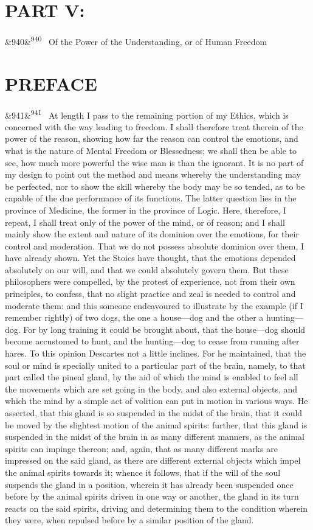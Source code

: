 \documentclass[12pt]{article}
\newcommand{\para}[1][]{\par\noindent\ifx&#1&\else\textsuperscript{\footnotesize #1}~\fi}
\begin{document}
\section*{PART V:}

\para[940] Of the Power of the Understanding, or of Human Freedom

\section*{PREFACE}

\para[941] At length I pass to the remaining portion of my Ethics, which is concerned with the way leading to freedom. I shall therefore treat therein of the power of the reason, showing how far the reason can control the emotions, and what is the nature of Mental Freedom or Blessedness; we shall then be able to see, how much more powerful the wise man is than the ignorant. It is no part of my design to point out the method and means whereby the understanding may be perfected, nor to show the skill whereby the body may be so tended, as to be capable of the due performance of its functions. The latter question lies in the province of Medicine, the former in the province of Logic. Here, therefore, I repeat, I shall treat only of the power of the mind, or of reason; and I shall mainly show the extent and nature of its dominion over the emotions, for their control and moderation. That we do not possess absolute dominion over them, I have already shown. Yet the Stoics have thought, that the emotions depended absolutely on our will, and that we could absolutely govern them. But these philosophers were compelled, by the protest of experience, not from their own principles, to confess, that no slight practice and zeal is needed to control and moderate them: and this someone endeavoured to illustrate by the example (if I remember rightly) of two dogs, the one a house---dog and the other a hunting---dog. For by long training it could be brought about, that the house---dog should become accustomed to hunt, and the hunting---dog to cease from running after hares. To this opinion Descartes not a little inclines. For he maintained, that the soul or mind is specially united to a particular part of the brain, namely, to that part called the pineal gland, by the aid of which the mind is enabled to feel all the movements which are set going in the body, and also external objects, and which the mind by a simple act of volition can put in motion in various ways. He asserted, that this gland is so suspended in the midst of the brain, that it could be moved by the slightest motion of the animal spirits: further, that this gland is suspended in the midst of the brain in as many different manners, as the animal spirits can impinge thereon; and, again, that as many different marks are impressed on the said gland, as there are different external objects which impel the animal spirits towards it; whence it follows, that if the will of the soul suspends the gland in a position, wherein it has already been suspended once before by the animal spirits driven in one way or another, the gland in its turn reacts on the said spirits, driving and determining them to the condition wherein they were, when repulsed before by a similar position of the gland. 
\end{document}
